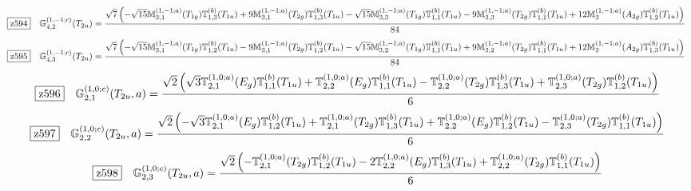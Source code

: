 \documentclass[fleqn,10pt,landscape]{jsarticle}
\begin{document}
\begin{dmath*}
\hspace*{3mm}\fbox{z594}\quad \mathbb{G}_{4,2}^{(1,-1;c)}(T_{2u})=\frac{\sqrt{7} \left(- \sqrt{15} \mathbb{M}_{3,1}^{(1,-1;a)}(T_{1g}) \mathbb{T}_{1,3}^{(b)}(T_{1u}) + 9 \mathbb{M}_{3,1}^{(1,-1;a)}(T_{2g}) \mathbb{T}_{1,3}^{(b)}(T_{1u}) - \sqrt{15} \mathbb{M}_{3,3}^{(1,-1;a)}(T_{1g}) \mathbb{T}_{1,1}^{(b)}(T_{1u}) - 9 \mathbb{M}_{3,3}^{(1,-1;a)}(T_{2g}) \mathbb{T}_{1,1}^{(b)}(T_{1u}) + 12 \mathbb{M}_{3}^{(1,-1;a)}(A_{2g}) \mathbb{T}_{1,2}^{(b)}(T_{1u})\right)}{84}
\end{dmath*}
\begin{dmath*}
\hspace*{3mm}\fbox{z595}\quad \mathbb{G}_{4,3}^{(1,-1;c)}(T_{2u})=\frac{\sqrt{7} \left(- \sqrt{15} \mathbb{M}_{3,1}^{(1,-1;a)}(T_{1g}) \mathbb{T}_{1,2}^{(b)}(T_{1u}) - 9 \mathbb{M}_{3,1}^{(1,-1;a)}(T_{2g}) \mathbb{T}_{1,2}^{(b)}(T_{1u}) - \sqrt{15} \mathbb{M}_{3,2}^{(1,-1;a)}(T_{1g}) \mathbb{T}_{1,1}^{(b)}(T_{1u}) + 9 \mathbb{M}_{3,2}^{(1,-1;a)}(T_{2g}) \mathbb{T}_{1,1}^{(b)}(T_{1u}) + 12 \mathbb{M}_{3}^{(1,-1;a)}(A_{2g}) \mathbb{T}_{1,3}^{(b)}(T_{1u})\right)}{84}
\end{dmath*}
\begin{dmath*}
\hspace*{3mm}\fbox{z596}\quad \mathbb{G}_{2,1}^{(1,0;c)}(T_{2u},a)=\frac{\sqrt{2} \left(\sqrt{3} \mathbb{T}_{2,1}^{(1,0;a)}(E_{g}) \mathbb{T}_{1,1}^{(b)}(T_{1u}) + \mathbb{T}_{2,2}^{(1,0;a)}(E_{g}) \mathbb{T}_{1,1}^{(b)}(T_{1u}) - \mathbb{T}_{2,2}^{(1,0;a)}(T_{2g}) \mathbb{T}_{1,3}^{(b)}(T_{1u}) + \mathbb{T}_{2,3}^{(1,0;a)}(T_{2g}) \mathbb{T}_{1,2}^{(b)}(T_{1u})\right)}{6}
\end{dmath*}
\begin{dmath*}
\hspace*{3mm}\fbox{z597}\quad \mathbb{G}_{2,2}^{(1,0;c)}(T_{2u},a)=\frac{\sqrt{2} \left(- \sqrt{3} \mathbb{T}_{2,1}^{(1,0;a)}(E_{g}) \mathbb{T}_{1,2}^{(b)}(T_{1u}) + \mathbb{T}_{2,1}^{(1,0;a)}(T_{2g}) \mathbb{T}_{1,3}^{(b)}(T_{1u}) + \mathbb{T}_{2,2}^{(1,0;a)}(E_{g}) \mathbb{T}_{1,2}^{(b)}(T_{1u}) - \mathbb{T}_{2,3}^{(1,0;a)}(T_{2g}) \mathbb{T}_{1,1}^{(b)}(T_{1u})\right)}{6}
\end{dmath*}
\begin{dmath*}
\hspace*{3mm}\fbox{z598}\quad \mathbb{G}_{2,3}^{(1,0;c)}(T_{2u},a)=\frac{\sqrt{2} \left(- \mathbb{T}_{2,1}^{(1,0;a)}(T_{2g}) \mathbb{T}_{1,2}^{(b)}(T_{1u}) - 2 \mathbb{T}_{2,2}^{(1,0;a)}(E_{g}) \mathbb{T}_{1,3}^{(b)}(T_{1u}) + \mathbb{T}_{2,2}^{(1,0;a)}(T_{2g}) \mathbb{T}_{1,1}^{(b)}(T_{1u})\right)}{6}
\end{dmath*}
\end{document}
